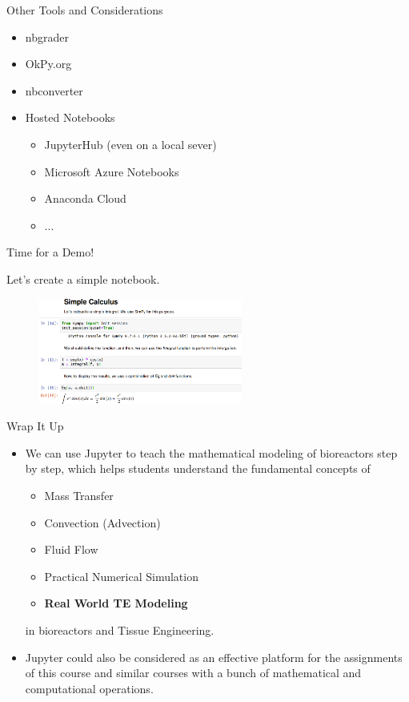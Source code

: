 \documentclass[11pt,t]{beamer}
\begin{document}
\begin{frame}[fragile]{Other Tools and Considerations}  
			
\begin{itemize}
\item
nbgrader
\item
OkPy.org
\item
nbconverter
\item
Hosted Notebooks
\begin{itemize}
\item
JupyterHub (even on a local sever)
\item
Microsoft Azure Notebooks
\item
Anaconda Cloud
\item
...
\end{itemize}
\end{itemize}


\end{frame}


\begin{frame}[fragile]{Time for a Demo!}  
			
			\begin{center}
			Let's create a simple notebook.
			\end{center}

			\begin{figure}
			\centering
			\includegraphics[width=0.6\textwidth]{jupyter_demo}
			
			\end{figure}
\end{frame}


\begin{frame}[fragile]{Wrap It Up}  
			
\begin{itemize}
\item
We can use Jupyter to teach the mathematical modeling of bioreactors step by step, which helps students understand the fundamental concepts of
\begin{itemize}
\item
Mass Transfer
\item
Convection (Advection)
\item
Fluid Flow
\item
Practical Numerical Simulation
\item
\textbf{Real World TE Modeling}
\end{itemize}
in bioreactors and Tissue Engineering.
\item
Jupyter could also be  considered as an effective platform for the assignments of this course and similar courses with a bunch of mathematical and computational operations.
\end{itemize}

\end{frame}
\end{document}
